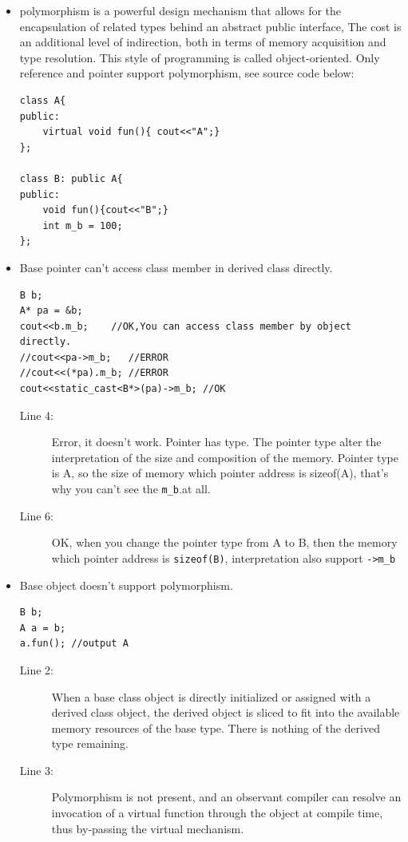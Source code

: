 \documentclass[a4paper,11pt,twoside]{book}
\begin{document}
\begin{itemize}
	\item polymorphism is a powerful design mechanism that allows for the encapsulation of related types behind an abstract public interface, The cost is an additional level of indirection, both in terms of memory acquisition and type resolution. This style of programming is called object-oriented. Only reference and pointer support polymorphism, see source code below:

\begin{lstlisting}[numbers=none]
class A{
public:
	virtual void fun(){ cout<<"A";}
};
	
class B: public A{
public:
	void fun(){cout<<"B";}
	int m_b = 100;
};
\end{lstlisting}

	\item Base pointer can't access class member in derived class directly.
	
\begin{lstlisting}
B b;
A* pa = &b;
cout<<b.m_b;    //OK,You can access class member by object directly.
//cout<<pa->m_b;   //ERROR 
//cout<<(*pa).m_b; //ERROR
cout<<static_cast<B*>(pa)->m_b; //OK
\end{lstlisting}
\begin{description}
	\item[Line 4:] Error, it doesn't work. Pointer has type. The pointer type alter the interpretation of the size and composition of the memory. Pointer type is A, so the size of memory which pointer address is sizeof(A), that's why you can't see the \texttt{m\_b}.at all.
	\item[Line 6:] OK, when you change the pointer type from A to B, then the memory which pointer address is \texttt{sizeof(B)}, interpretation also support \texttt{->m\_b} 
\end{description}

\item Base object doesn't support polymorphism.
\begin{lstlisting}
B b;
A a = b;
a.fun(); //output A
\end{lstlisting}
\begin{description}
	\item[Line 2:] When a base class object is directly initialized or assigned with a derived class object, the derived object is sliced to fit into the available memory resources of the base type. There is nothing of the derived type remaining. 
	\item[Line 3:] Polymorphism is not present, and an observant compiler can resolve an invocation of a virtual function through the object at compile time, thus by-passing the virtual mechanism.
\end{description}


\end{itemize}
\end{document}
